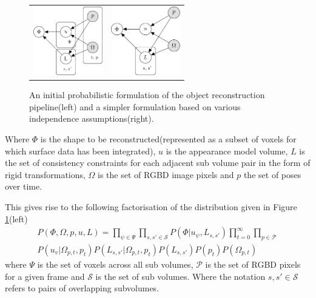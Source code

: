 \begin{figure}[!t]
	\centering
	\begin{tabular}{cc}
		\includegraphics[height=3cm]{graphical_models/pgm1.pdf}&
		\includegraphics[height=3cm]{graphical_models/pgm2.pdf}
		\vspace{-3mm}
	\end{tabular}
	\caption{An initial probabilistic formulation of the object reconstruction pipeline(left) and a simpler formulation based on various independence assumptions(right).}
	\label{fig:pgm}
\end{figure}

Where $\Phi$ is the shape to be reconstructed(represented as a subset of voxels for which surface data has been integrated), $u$ is the appearance model volume, $L$ is the 
set of consistency constraints for each adjacent sub volume pair in the form of rigid transformations, $\Omega$ is the set of 
RGBD image pixels and $p$ the set of poses over time.

This gives rise to the following factorisation of the distribution given in Figure \ref{fig:pgm}(left)
\begin{equation}
\begin{split}
P(\Phi, \Omega, p, u, L) = 
\prod_{\psi \in \Psi}\prod_{s, s' \in \mathcal{S}}P(\Phi|u_{\psi}, L_{s, s'}) 
\prod_{t=0}^{\infty}\prod_{p \in \mathcal{P}}\\
P(u_{v}|\Omega_{p, t}, p_{t})
P(L_{s, s'}|\Omega_{p, t}, p_{t})
P(L_{s, s'})P(p_{t})P(\Omega_{p, t})
\end{split}
\end{equation}
where $\Psi$ is the set of voxels across all sub volumes, $\mathcal{P}$ is the set of RGBD pixels for a given 
frame and $\mathcal{S}$ is the set of sub volumes. Where the notation $s, s' \in \mathcal{S}$ refers to pairs of overlapping subvolumes.

